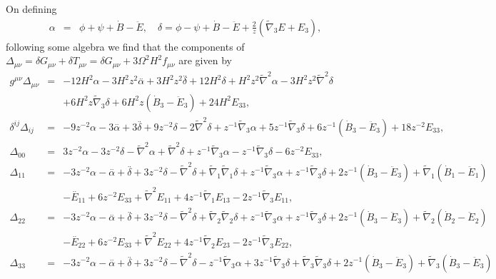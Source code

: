\documentclass[aps,onecolumn,10pt]{revtex4}
\numberwithin{equation}{section}
\numberwithin{equation}{section}
\begin{document}
On defining
%
\begin{eqnarray}
\alpha &=& \phi +\psi+\dot B - \ddot E, \quad \delta = \phi -\psi + \dot B - \ddot E + \frac{2}{z}(\tilde\nabla_3 E + E_3),
\label{14.3}
\end{eqnarray}
%
following some algebra we find that the components of $\Delta_{\mu\nu}=\delta G_{\mu\nu}+\delta T_{\mu\nu}=\delta G_{\mu\nu}+ 3\Omega^2 H^2 f_{\mu\nu}$ are given by 
%
\begin{eqnarray}
g^{\mu\nu}\Delta_{\mu\nu}&=& -12 H^2 \alpha - 3 H^2 z^2 \overset{..}{\alpha} + 3 H^2 z^2 \overset{..}{\delta} + 12 H^2 \delta + H^2 z^2 \tilde\nabla^{2}{}\alpha - 3 H^2 z^2 \tilde\nabla^{2}{}\delta 
\nonumber \\ 
&& + 6 H^2 z \tilde{\nabla}_{3}\delta +6 H^2 z (\dot{B}_3-\ddot{E}_3)+24 H^2 E_{33},
  \nonumber\\ 
\delta^{ij}\Delta_{ij}&=& -9 z^{-2} \alpha - 3 \overset{..}{\alpha} + 3 \overset{..}{\delta} + 9 z^{-2} \delta - 2 \tilde\nabla^{2}{}\delta + z^{-1} \tilde{\nabla}_{3}\alpha + 5 z^{-1} \tilde{\nabla}_{3}\delta +6 z^{-1} (\dot{B}_3-\ddot{E}_3)+18 z^{-2} E_{33},
 \nonumber\\ 
\Delta_{00}&=& 3 z^{-2} \alpha - 3 z^{-2} \delta -  \tilde\nabla^{2}{}\alpha + \tilde\nabla^{2}{}\delta + z^{-1} \tilde{\nabla}_{3}\alpha -  z^{-1} \tilde{\nabla}_{3}\delta -6 z^{-2} E_{33},
 \nonumber\\ 
\Delta_{11}&=& -3 z^{-2} \alpha -  \overset{..}{\alpha} + \overset{..}{\delta} + 3 z^{-2} \delta -  \tilde\nabla^{2}{}\delta + \tilde{\nabla}_{1}\tilde{\nabla}_{1}\delta + z^{-1} \tilde{\nabla}_{3}\alpha + z^{-1} \tilde{\nabla}_{3}\delta +2 z^{-1} (\dot{B}_3-\ddot{E}_3) + \tilde{\nabla}_{1}(\dot{B}_1-\ddot{E}_1)
\nonumber \\ 
&&- \overset{..}{E}_{11} + 6 z^{-2} E_{33} + \tilde\nabla^{2}{}E_{11} + 4 z^{-1} \tilde{\nabla}_{1}E_{13} - 2 z^{-1} \tilde{\nabla}_{3}E_{11},
 \nonumber\\ 
\Delta_{22}&=& -3 z^{-2} \alpha -  \overset{..}{\alpha} + \overset{..}{\delta} + 3 z^{-2} \delta -  \tilde\nabla^{2}{}\delta + \tilde{\nabla}_{2}\tilde{\nabla}_{2}\delta + z^{-1} \tilde{\nabla}_{3}\alpha + z^{-1} \tilde{\nabla}_{3}\delta +2 z^{-1} (\dot{B}_3-\ddot{E}_3) + \tilde{\nabla}_{2}(\dot{B}_2-\ddot{E}_2) 
\nonumber \\ 
&& - \overset{..}{E}_{22}+ 6 z^{-2} E_{33} + \tilde\nabla^{2}{}E_{22} + 4 z^{-1} \tilde{\nabla}_{2}E_{23} - 2 z^{-1} \tilde{\nabla}_{3}E_{22},
 \nonumber\\ 
\Delta_{33}&=& -3 z^{-2} \alpha -  \overset{..}{\alpha} + \overset{..}{\delta} + 3 z^{-2} \delta -  \tilde\nabla^{2}{}\delta -  z^{-1} \tilde{\nabla}_{3}\alpha + 3 z^{-1} \tilde{\nabla}_{3}\delta + \tilde{\nabla}_{3}\tilde{\nabla}_{3}\delta +2 z^{-1} (\dot{B}_3-\ddot{E}_3) + \tilde{\nabla}_{3}(\dot{B}_3-\ddot{E}_3)

\end{eqnarray}
\end{document}
